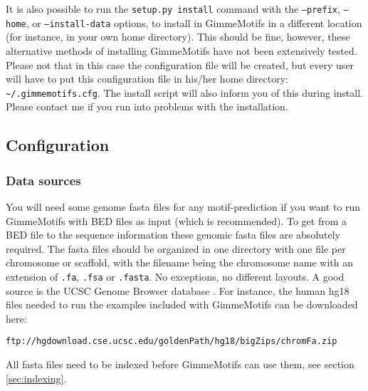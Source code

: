 \documentclass[11pt]{article}
\begin{document}
It is also possible to run the \texttt{setup.py install} command with the \texttt{--prefix}, \texttt{--home}, or \texttt{--install-data} options, to install in GimmeMotifs in a different location (for instance, in your own home directory). This should be fine, however, these alternative methods of installing GimmeMotifs have not been extensively tested. Please not that in this case the configuration file will be created, but every user will have to put this configuration file in his/her home directory: \texttt{\textasciitilde{}/.gimmemotifs.cfg}. The install script will also inform you of this during install. Please contact me if you run into problems with the installation.

\subsection{Configuration}
\label{sec:configuration}

\subsubsection{Data sources}
You will need some genome fasta files for any motif-prediction if you want to run GimmeMotifs with BED files as input (which is recommended). To get from a BED file to the sequence information these genomic fasta files are absolutely required. The fasta files should be organized in one directory with one file per chromosome or scaffold, with the filename being the chromosome name with an extension of \texttt{.fa}, \texttt{.fsa} or \texttt{.fasta}. No exceptions, no different layouts. A good source is the UCSC Genome Browser database \cite{rhead_ucsc_2010}. For instance, the human hg18 files needed to run the examples included with GimmeMotifs can be downloaded here:
\begin{verbatim}
ftp://hgdownload.cse.ucsc.edu/goldenPath/hg18/bigZips/chromFa.zip
 \end{verbatim}
All fasta files need to be indexed before GimmeMotifs can use them, see section \ref{sec:indexing}.
\end{document}
